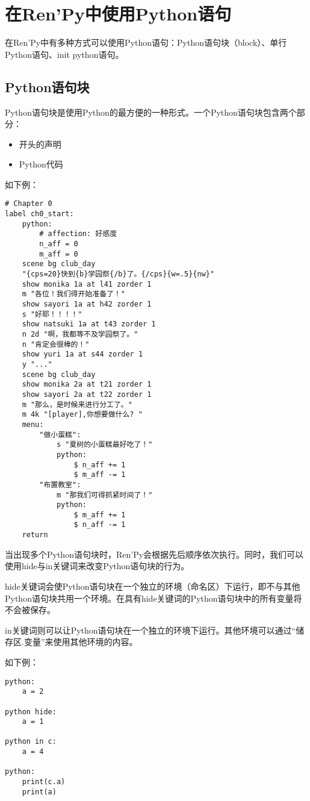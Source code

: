 \section{在Ren'Py中使用Python语句}
\label{sec:3.2}
在Ren'Py中有多种方式可以使用Python语句：Python语句块（block）、单行Python语句、init python语句。

\subsection{Python语句块}
Python语句块是使用Python的最方便的一种形式。一个Python语句块包含两个部分：
\begin{itemize}
    \item 开头的声明
    \item Python代码
\end{itemize}

如下例：

\begin{lstlisting}
# Chapter 0
label ch0_start:
    python:
        # affection: 好感度
        n_aff = 0
        m_aff = 0
    scene bg club_day
    "{cps=20}快到{b}学园祭{/b}了。{/cps}{w=.5}{nw}"
    show monika 1a at l41 zorder 1
    m "各位！我们得开始准备了！"
    show sayori 1a at h42 zorder 1
    s "好耶！！！！"
    show natsuki 1a at t43 zorder 1
    n 2d "啊，我都等不及学园祭了。"
    n "肯定会很棒的！"
    show yuri 1a at s44 zorder 1
    y "..."
    scene bg club_day
    show monika 2a at t21 zorder 1
    show sayori 2a at t22 zorder 1
    m "那么，是时候来进行分工了。"
    m 4k "[player],你想要做什么? "
    menu:
        "做小蛋糕":
            s "夏树的小蛋糕最好吃了！"
            python:
                $ n_aff += 1
                $ m_aff -= 1
        "布置教室":
            m "那我们可得抓紧时间了！"
            python:
                $ m_aff += 1
                $ n_aff -= 1
    return

\end{lstlisting}

当出现多个Python语句块时，Ren'Py会根据先后顺序依次执行。同时，我们可以使用hide与in关键词来改变Python语句块的行为。

hide关键词会使Python语句块在一个独立的环境（命名区）下运行，即不与其他Python语句块共用一个环境。在具有hide关键词的Python语句块中的所有变量将不会被保存。

in关键词则可以让Python语句块在一个独立的环境下运行。其他环境可以通过“储存区.变量”来使用其他环境的内容。

如下例：
\begin{lstlisting}
python:
    a = 2

python hide:
    a = 1

python in c:
    a = 4

python:
    print(c.a)
    print(a)
\end{lstlisting}

